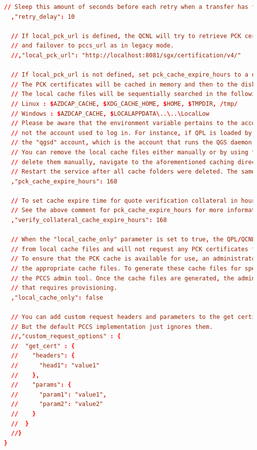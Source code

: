 \documentclass{article}
\begin{document}
\begin{lstlisting}[caption=Configurazione remote attestation per le Architectural Enclaves,label=default-qcnl.conf,language=toml]
  // Sleep this amount of seconds before each retry when a transfer has failed with a transient error
  ,"retry_delay": 10

  // If local_pck_url is defined, the QCNL will try to retrieve PCK cert chain from local_pck_url first,
  // and failover to pccs_url as in legacy mode.
  //,"local_pck_url": "http://localhost:8081/sgx/certification/v4/"

  // If local_pck_url is not defined, set pck_cache_expire_hours to a none-zero value will enable local cache.
  // The PCK certificates will be cached in memory and then to the disk drive.
  // The local cache files will be sequentially searched in the following directories until located in one of them:
  // Linux : $AZDCAP_CACHE, $XDG_CACHE_HOME, $HOME, $TMPDIR, /tmp/
  // Windows : $AZDCAP_CACHE, $LOCALAPPDATA\..\..\LocalLow
  // Please be aware that the environment variable pertains to the account executing the process that loads QPL,
  // not the account used to log in. For instance, if QPL is loaded by QGS, then those environment variables relate to
  // the "qgsd" account, which is the account that runs the QGS daemon.
  // You can remove the local cache files either manually or by using the QPL API, sgx_qpl_clear_cache. If you opt to
  // delete them manually, navigate to the aforementioned caching directories, find the folder named .dcap-qcnl, and delete it.
  // Restart the service after all cache folders were deleted. The same method applies to "verify_collateral_cache_expire_hours"
  ,"pck_cache_expire_hours": 168

  // To set cache expire time for quote verification collateral in hours
  // See the above comment for pck_cache_expire_hours for more information on the local cache.
  ,"verify_collateral_cache_expire_hours": 168

  // When the "local_cache_only" parameter is set to true, the QPL/QCNL will exclusively use PCK certificates
  // from local cache files and will not request any PCK certificates from service providers, whether local or remote.
  // To ensure that the PCK cache is available for use, an administrator must pre-populate the cache folders with
  // the appropriate cache files. To generate these cache files for specific platforms, the administrator can use
  // the PCCS admin tool. Once the cache files are generated, the administrator must distribute them to each platform
  // that requires provisioning.
  ,"local_cache_only": false

  // You can add custom request headers and parameters to the get certificate API.
  // But the default PCCS implementation just ignores them.
  //,"custom_request_options" : {
  //  "get_cert" : {
  //    "headers": {
  //      "head1": "value1"
  //    },
  //    "params": {
  //      "param1": "value1",
  //      "param2": "value2"
  //    }
  //  }
  //}
}
\end{lstlisting}
\end{document}

